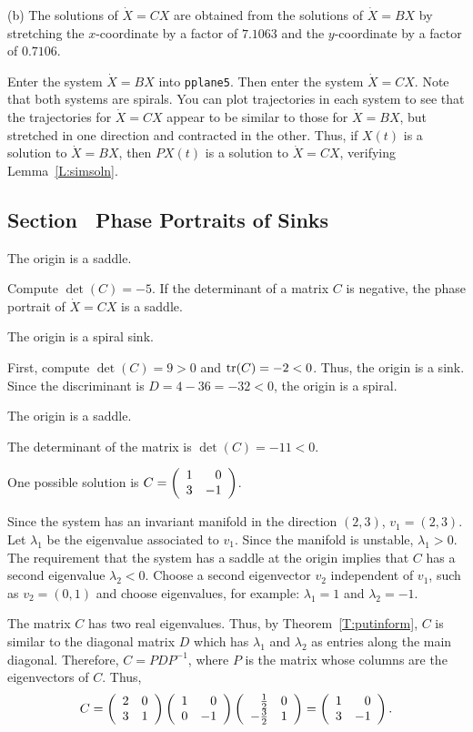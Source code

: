 (b) \ans The solutions of $\dot{X} = CX$ are obtained from the solutions
of $\dot{X} = BX$ by stretching the $x$-coordinate by a factor of $7.1063$
and the $y$-coordinate by a factor of $0.7106$.

\soln Enter the system $\dot{X} = BX$ into {\tt pplane5}.  Then enter the
system $\dot{X} = CX$.  Note that both systems are spirals.  You can
plot trajectories in each system to see that the trajectories for
$\dot{X} = CX$ appear to be similar to those for $\dot{X} = BX$, but
stretched in one direction and contracted in the other.  Thus, if
$X(t)$ is a solution to $\dot{X} = BX$, then $PX(t)$ is a solution to
$\dot{X} = CX$, verifying Lemma~\ref{L:simsoln}.



\subsection*{Section~\protect{\ref{S:PlanarSystems}} Phase Portraits of Sinks}

 \ans The origin is a saddle.

\soln Compute $\det(C) = -5$.  If the determinant of a matrix $C$ is
negative, the phase portrait of $\dot{X} = CX$ is a saddle.

 \ans The origin is a spiral sink.

\soln First, compute $\det(C) = 9 > 0$ and ${\rm tr}(C) = -2 < 0$.  Thus,
the origin is a sink.  Since the discriminant is $D = 4 - 36 = -32 < 0$,
the origin is a spiral.

 \ans The origin is a saddle.

\soln The determinant of the matrix is $\det(C) = -11 < 0$.

\ans One possible solution is $C = \left(\begin{array}{rr} 1 & 0\\ 3 &-1\end{array}\right)$.

\soln Since the system has an invariant manifold in the direction $(2,3)$,
$v_1 = (2,3)$.  Let $\lambda_1$ be the eigenvalue associated to $v_1$.
Since the manifold is unstable, $\lambda_1 > 0$.  The requirement
that the system has a saddle at the origin implies that $C$ has a second
eigenvalue $\lambda_2 < 0$.  Choose a second eigenvector $v_2$ independent
of $v_1$, such as $v_2 = (0,1)$ and choose eigenvalues, for example:
$\lambda_1 = 1$ and $\lambda_2 = -1$.

\para The matrix $C$ has two real eigenvalues.  Thus, by
Theorem~\ref{T:putinform}, $C$ is similar
to the diagonal matrix $D$ which has $\lambda_1$ and $\lambda_2$ as
entries along the main diagonal.  Therefore, $C = PDP^{-1}$, where $P$
is the matrix whose columns are the eigenvectors of $C$.  Thus,
\[
C = \left(\begin{array}{rr} 2 & 0\\ 3 &1\end{array}\right)\left(\begin{array}{rr} 1 & 0\\ 0 &-1\end{array}\right)\left(\begin{array}{rr} \frac{1}{2} & 0\\ -\frac{3}{2} &1\end{array}\right) = \left(\begin{array}{rr} 1 & 0\\ 3 &-1\end{array}\right). \]

